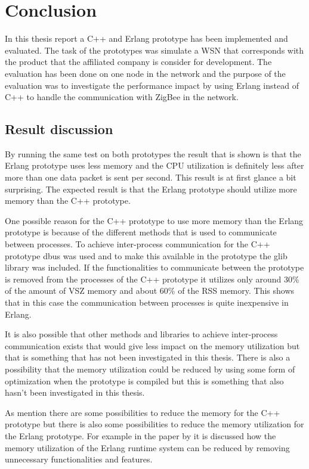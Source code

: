 \chapter{Conclusion}
In this thesis report a C++ and Erlang prototype has been implemented and evaluated. The task of the prototypes was simulate a WSN that corresponds with the product that the affiliated company is consider for development. The evaluation has been done on one node in the network and the purpose of the evaluation was to investigate the performance impact by using Erlang instead of C++ to handle the communication with ZigBee in the network.  

\section{Result discussion}
By running the same test on both prototypes the result that is shown is that the Erlang prototype uses less memory and the CPU utilization is definitely less after more than one data packet is sent per second. This result is at first glance a bit surprising. The expected result is that the Erlang prototype should utilize more memory than the C++ prototype. 

One possible reason for the C++ prototype to use more memory than the Erlang prototype is because of the different methods that is used to communicate between processes. To achieve inter-process communication for the C++ prototype dbus was used and to make this available in the prototype the glib library was included. If the functionalities to communicate between the prototype is removed from the processes of the C++ prototype it utilizes only around 30\% of the amount of VSZ memory and about 60\% of the RSS memory. This shows that in this case the communication between processes is quite inexpensive in Erlang.

It is also possible that other methods and libraries to achieve inter-process communication exists that would give less impact on the memory utilization but that is something that has not been investigated in this thesis. There is also a possibility that the memory utilization could be reduced by using some form of optimization when the prototype is compiled but this is something that also hasn't been investigated in this thesis. 

As mention there are some possibilities to reduce the memory for the C++ prototype but there is also some possibilities to reduce the memory utilization for the Erlang prototype. For example in the paper by \citet{sivieri2012erlang} it is discussed how the memory utilization of the Erlang runtime system can be reduced by removing unnecessary functionalities and features. 

